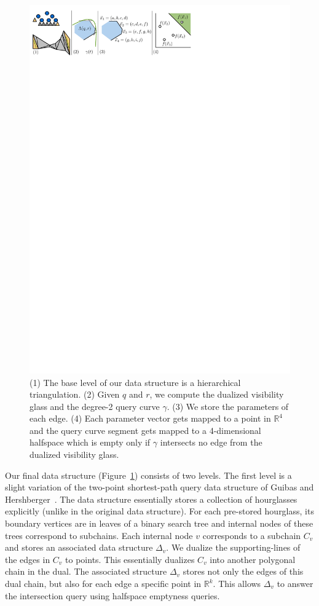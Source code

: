 \documentclass[a4paper, UKenglish]{lipics-v2018}
\begin{document}
\begin{figure}[h]
    \centering
    \includegraphics[]{../panel}
    \caption{(1) The base level of our data structure is a hierarchical triangulation. (2) Given $q$ and $r$, we compute the dualized visibility glass and the degree-2 query curve $\gamma$. (3) We store the parameters of each edge. (4) Each parameter vector gets mapped to a point in $\mathbb{R}^4$ and the query curve segment gets mapped to a 4-dimensional halfspace which is empty only if $\gamma$ intersects no edge from the dualized visibility glass.}
    \label{fig:panel}
\end{figure}

Our final data structure (Figure~\ref{fig:panel}) consists of two levels. The first level is a slight
variation of the two-point shortest-path query data structure of Guibas and
Hershberger~\cite{guibas1989optimal}. The data structure essentially stores a
collection of hourglasses explicitly (unlike in the original data structure). For each pre-stored hourglass, its boundary vertices are in leaves of a binary search tree and internal nodes of these trees correspond to subchains. Each internal node $v$ corresponds to a subchain $C_v$ and stores an associated data structure $\Delta_v$. We dualize the
supporting-lines of the edges in $C_v$ to points. This essentially dualizes $C_v$ into another polygonal chain in the dual. The associated structure $\Delta_v$ stores not only the  edges of this dual chain, but also for each edge a specific point in $\mathbb{R}^k$. This allows $\Delta_v$ to answer the intersection query using halfspace emptyness queries.
\end{document}
